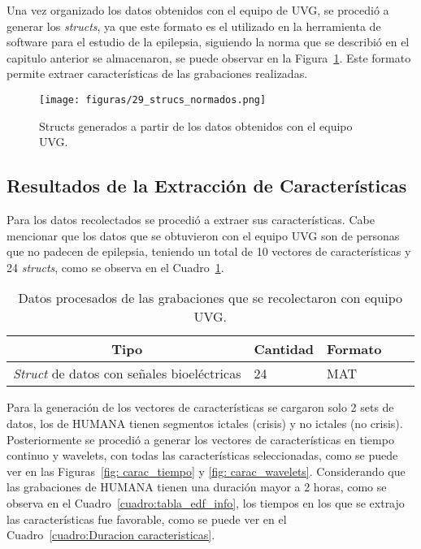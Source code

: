 Una vez organizado los datos obtenidos con el equipo de UVG, se procedió a generar los \textit{structs}, ya que este formato es el utilizado en la herramienta de software para el estudio de la epilepsia, siguiendo la norma que se describió en el capitulo anterior se almacenaron, se puede observar en la Figura~\ref{fig: Struct_normado}. Este formato permite extraer características de las grabaciones realizadas.

\begin{figure}[t]
    \centering
    \texttt{[image: figuras/29\_strucs\_normados.png]}
    \caption{Structs generados a partir de los datos obtenidos con el equipo UVG.}
    \label{fig: Struct_normado}
\end{figure}

\subsection{Resultados de la Extracción de Características}
Para los datos recolectados se procedió a extraer sus características. Cabe mencionar que los datos que se obtuvieron con el equipo UVG son de personas que no padecen de epilepsia, teniendo un total de 10 vectores de características y 24 \textit{structs}, como se observa en el Cuadro~\ref{cuadro:tabla datos features UVG}.

\begin{table}[H]
\begin{center}
    \begin{tabular}{|l|l|l|l|l|}
    \hline
        \multicolumn{1}{|c|}{\textbf{Tipo}} & \multicolumn{1}{c|}{\textbf{Cantidad}} & \multicolumn{1}{c|}{\textbf{Formato}}\\ \hline
        \textit{Struct} de datos con señales bioeléctricas & 24  & MAT \\ \hline
    \end{tabular}
    \caption[Datos procesados en nube con equipo UVG]{Datos procesados de las grabaciones que se recolectaron con equipo UVG.} 
    \label{cuadro:tabla datos features UVG}
\end{center}
\end{table}

Para la generación de los vectores de características se cargaron solo 2 sets de datos, los de HUMANA tienen segmentos ictales (crisis) y no ictales (no crisis).
Posteriormente se procedió a generar los vectores de características en tiempo continuo y wavelets, con todas las características seleccionadas, como se puede ver en las Figuras~\ref{fig: carac_tiempo} y \ref{fig: carac_wavelets}. Considerando que las grabaciones de HUMANA tienen una duración mayor a 2 horas, como se observa en el Cuadro~\ref{cuadro:tabla_edf_info}, los tiempos en los que se extrajo las características fue favorable, como se puede ver en el Cuadro~\ref{cuadro:Duracion caracteristicas}. 

